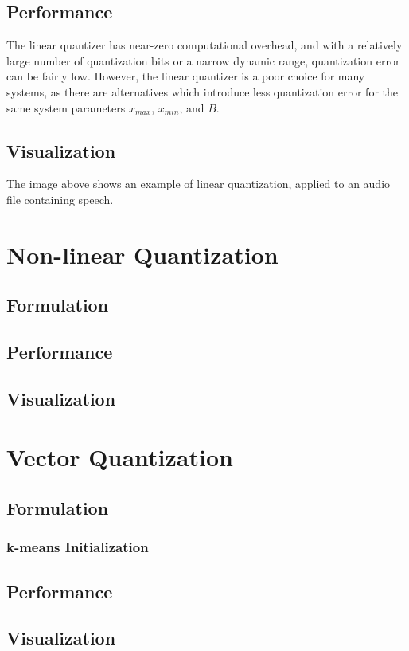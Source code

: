 \documentclass[journal]{IEEEtran}
\begin{document}
\subsection{Performance}
The linear quantizer has near-zero computational overhead, and with a relatively large number of quantization bits or a narrow 
dynamic range, quantization error can be fairly low. However, the linear quantizer is a poor choice for many systems, as there are
alternatives which introduce less quantization error for the same system parameters $x_{max}$, $x_{min}$, and $B$.

\subsection{Visualization}

The image above shows an example of linear quantization, applied to an audio file containing speech. 
\section{Non-linear Quantization}
\subsection{Formulation}
\subsection{Performance}
\subsection{Visualization}
\section{Vector Quantization}
\subsection{Formulation}
\subsubsection{k-means Initialization}
\subsection{Performance}
\subsection{Visualization}
\end{document}
